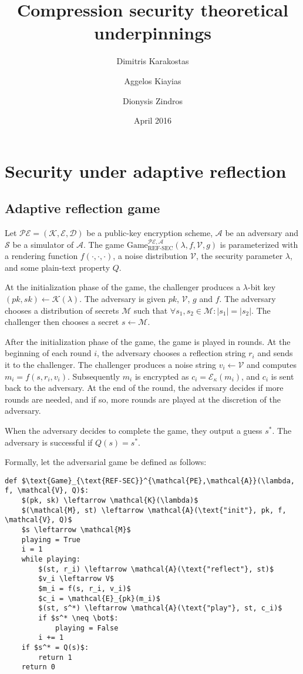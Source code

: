 \documentclass{article}
\title{Compression security theoretical underpinnings}
\author{
Dimitris Karakostas
\and
Aggelos Kiayias
\and
Dionysis Zindros
}
\date{April 2016}
\begin{document}
\maketitle

\section*{Security under adaptive reflection}

\subsection*{Adaptive reflection game}

Let $\mathcal{PE} = (\mathcal{K}, \mathcal{E}, \mathcal{D})$ be a public-key
encryption scheme, $\mathcal{A}$ be an adversary and $\mathcal{S}$ be a
simulator of $\mathcal{A}$.  The game
$\text{Game}_{\text{REF-SEC}}^{\mathcal{PE},\mathcal{A}}(\lambda,  f,
\mathcal{V}, g)$ is parameterized with a rendering function $f(\cdot, \cdot,
\cdot)$, a noise distribution $\mathcal{V}$, the security parameter $\lambda$,
and some plain-text property $Q$.

At the initialization phase of the game, the challenger produces a
$\lambda$-bit key $(pk, sk) \leftarrow \mathcal{K}(\lambda)$. The adversary is
given $pk$, $\mathcal{V}$, $g$ and $f$.  The adversary chooses a distribution
of secrets $\mathcal{M}$ such that $\forall s_1, s_2 \in \mathcal{M}: |s_1| =
|s_2|$.  The challenger then chooses a secret $s \leftarrow \mathcal{M}$.

After the initialization phase of the game, the game is played in rounds. At
the beginning of each round $i$, the adversary chooses a reflection string
$r_i$ and sends it to the challenger. The challenger produces a noise string
$v_i \leftarrow \mathcal{V}$ and computes $m_i = f(s, r_i, v_i)$.  Subsequently
$m_i$ is encrypted as $c_i = \mathcal{E}_\kappa(m_i)$, and $c_i$ is sent back
to the adversary. At the end of the round, the adversary  decides if more
rounds are needed, and if so, more rounds are played at the discretion of the
adversary.

When the adversary decides to complete the game, they output a guess $s^*$. The
adversary is successful if $Q(s) = s^*$.

Formally, let the adversarial game be defined as follows:

\begin{lstlisting}[texcl,mathescape]
def $\text{Game}_{\text{REF-SEC}}^{\mathcal{PE},\mathcal{A}}(\lambda, f, \mathcal{V}, Q)$:
    $(pk, sk) \leftarrow \mathcal{K}(\lambda)$
    $(\mathcal{M}, st) \leftarrow \mathcal{A}(\text{"init"}, pk, f, \mathcal{V}, Q)$
    $s \leftarrow \mathcal{M}$
    playing = True
    i = 1
    while playing:
        $(st, r_i) \leftarrow \mathcal{A}(\text{"reflect"}, st)$
        $v_i \leftarrow V$
        $m_i = f(s, r_i, v_i)$
        $c_i = \mathcal{E}_{pk}(m_i)$
        $(st, s^*) \leftarrow \mathcal{A}(\text{"play"}, st, c_i)$
        if $s^* \neq \bot$:
            playing = False
        i += 1
    if $s^* = Q(s)$:
        return 1
    return 0
\end{lstlisting}
\end{document}
